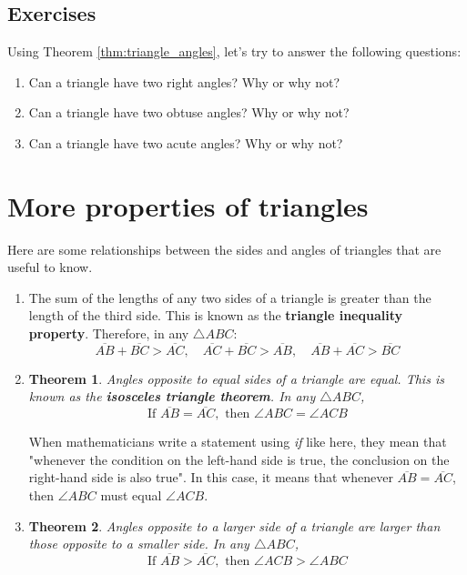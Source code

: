 \documentclass[11pt]{article}
\newtheorem{theorem}{Theorem}[section]
\begin{document}
\subsection{Exercises}
Using Theorem \ref{thm:triangle_angles}, let's try to answer the following questions:
\begin{framed}
    \begin{enumerate}
        \item Can a triangle have two right angles? Why or why not?
        \item Can a triangle have two obtuse angles? Why or why not?
        \item Can a triangle have two acute angles? Why or why not?
    \end{enumerate}
\end{framed}
\newpage
\section{More properties of triangles}
Here are some relationships between the sides and angles of triangles that are useful to know.
\begin{enumerate}
    \item The sum of the lengths of any two sides of a triangle is greater than the length of the third side. This is known as the \textbf{triangle inequality property}. Therefore, in any $\triangle ABC$:
          \begin{equation*}
              \overline{AB} + \overline{BC} > \overline{AC}, \quad \overline{AC} + \overline{BC} > \overline{AB}, \quad \overline{AB} + \overline{AC} > \overline{BC}
          \end{equation*}
    \item \begin{theorem} Angles opposite to equal sides of a triangle are equal. This is known as the \textbf{isosceles triangle theorem}. In any $\triangle ABC$,
              \begin{equation*}
                  \text{If } \overline{AB} = \overline{AC}, \text{ then } \angle ABC = \angle ACB
              \end{equation*}
              \label{thm:isosceles_triangle}
          \end{theorem}
          When mathematicians write a statement using \textit{if} like here, they mean that "whenever the condition on the left-hand side is true, the conclusion on the right-hand side is also true". In this case, it means that whenever $\overline{AB} = \overline{AC}$, then $\angle ABC$ must equal $\angle ACB$.
    \item \begin{theorem} Angles opposite to a larger side of a triangle are larger than those opposite to a smaller side. In any $\triangle ABC$,
              \begin{equation*}
                  \text{If } \overline{AB} > \overline{AC}, \text{ then } \angle ACB > \angle ABC
              \end{equation*}
              \label{thm:larger_side_larger_angle_triangle}
          \end{theorem}
\end{enumerate}
\end{document}
